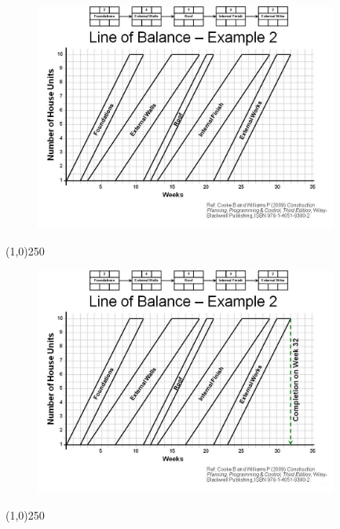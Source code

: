 \begin{frame}
\begin{figure}
	\centering
		\includegraphics[width = 10.0cm]{oldnotes/Slide265.jpg}
\end{figure}
\end{frame}
\begin{center}\line(1,0){250}\end{center}






\begin{frame}
\begin{figure}
	\centering
		\includegraphics[width = 10.0cm]{oldnotes/Slide266.jpg}
\end{figure}
\end{frame}
\begin{center}\line(1,0){250}\end{center}






